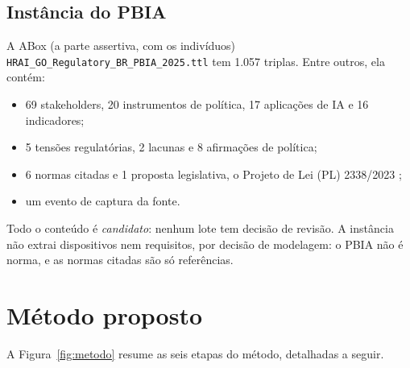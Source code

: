 \documentclass[12pt,a4paper,oneside,english,brazil]{abntex2}
\begin{document}
\section{Instância do PBIA}
A ABox (a parte assertiva, com os indivíduos) \texttt{HRAI\_\allowbreak GO\_\allowbreak Regulatory\_\allowbreak BR\_\allowbreak PBIA\_\allowbreak 2025.ttl} tem 1.057 triplas. Entre outros, ela contém:
\begin{itemize}[leftmargin=*]
  \item 69 stakeholders, 20 instrumentos de política, 17 aplicações de IA e 16 indicadores;
  \item 5 tensões regulatórias, 2 lacunas e 8 afirmações de política;
  \item 6 normas citadas e 1 proposta legislativa, o Projeto de Lei (PL) 2338/2023 \cite{pl2338-2023};
  \item um evento de captura da fonte.
\end{itemize}
Todo o conteúdo é \emph{candidato}: nenhum lote tem decisão de revisão. A instância não extrai dispositivos nem requisitos, por decisão de modelagem: o PBIA não é norma, e as normas citadas são só referências.

\chapter{Método proposto}\label{cap:metodo}

A Figura~\ref{fig:metodo} resume as seis etapas do método, detalhadas a seguir.
\end{document}
